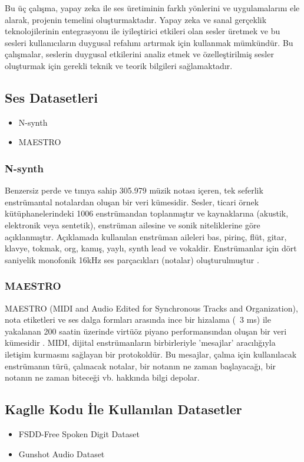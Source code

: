 \documentclass[12pt, a4paper]{article}
\begin{document}
	Bu üç çalışma, yapay zeka ile ses üretiminin farklı yönlerini ve uygulamalarını ele alarak, projenin temelini oluşturmaktadır. Yapay zeka ve sanal gerçeklik teknolojilerinin entegrasyonu ile iyileştirici etkileri olan sesler üretmek ve bu sesleri kullanıcıların duygusal refahını artırmak için kullanmak mümkündür. Bu çalışmalar, seslerin duygusal etkilerini analiz etmek ve özelleştirilmiş sesler oluşturmak için gerekli teknik ve teorik bilgileri sağlamaktadır.


	\subsection{Ses Datasetleri} 	
	\begin{itemize}
		\item N-synth
		\item MAESTRO
	\end{itemize}
	
	\subsubsection{N-synth} 
	Benzersiz perde ve tınıya sahip 305.979 müzik notası içeren, tek seferlik enstrümantal notalardan oluşan bir veri kümesidir. Sesler, ticari örnek kütüphanelerindeki 1006 enstrümandan toplanmıştır ve kaynaklarına (akustik, elektronik veya sentetik), enstrüman ailesine ve sonik niteliklerine göre açıklanmıştır. Açıklamada kullanılan enstrüman aileleri bas, pirinç, flüt, gitar, klavye, tokmak, org, kamış, yaylı, synth lead ve vokaldir. Enstrümanlar için dört saniyelik monofonik 16kHz ses parçacıkları (notalar) oluşturulmuştur \cite{nsynth}.
	
	\subsubsection{MAESTRO} 	
	MAESTRO (MIDI and Audio Edited for Synchronous Tracks and Organization), nota etiketleri ve ses dalga formları arasında ince bir hizalama (~3 ms) ile yakalanan 200 saatin üzerinde virtüöz piyano performansından oluşan bir veri kümesidir \cite{maestro}.  
	MIDI, dijital enstrümanların birbirleriyle 'mesajlar' aracılığıyla iletişim kurmasını sağlayan bir protokoldür. Bu mesajlar, çalma için kullanılacak enstrümanın türü, çalınacak notalar, bir notanın ne zaman başlayacağı, bir notanın ne zaman biteceği vb. hakkında bilgi depolar.
	\vspace*{2\baselineskip}
	
	
	\subsection{Kaglle Kodu İle Kullanılan Datasetler} 	
	\vspace*{1\baselineskip}
	\begin{itemize}
		\item FSDD-Free Spoken Digit Dataset
		\item Gunshot Audio Dataset
	\end{itemize}
\end{document}
